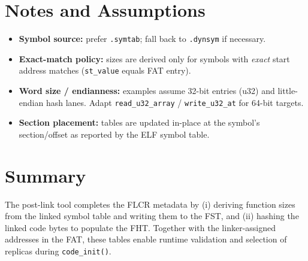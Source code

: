 \section{Notes and Assumptions}
\begin{itemize}
  \item \textbf{Symbol source:} prefer \texttt{.symtab}; fall back to \texttt{.dynsym} if necessary.
  \item \textbf{Exact-match policy:} sizes are derived only for symbols with
        \emph{exact} start address matches (\texttt{st\_value} equals FAT entry).
  \item \textbf{Word size / endianness:} examples assume 32-bit entries (u32) and little-endian hash lanes.
        Adapt \texttt{read\_u32\_array} / \texttt{write\_u32\_at} for 64-bit targets.
  \item \textbf{Section placement:} tables are updated in-place at the symbol’s
        section/offset as reported by the ELF symbol table.
\end{itemize}

\section{Summary}
The post-link tool completes the FLCR metadata by (i) deriving function sizes
from the linked symbol table and writing them to the FST, and (ii) hashing the
linked code bytes to populate the FHT. Together with the linker-assigned
addresses in the FAT, these tables enable runtime validation and selection of
replicas during \texttt{code\_init()}.